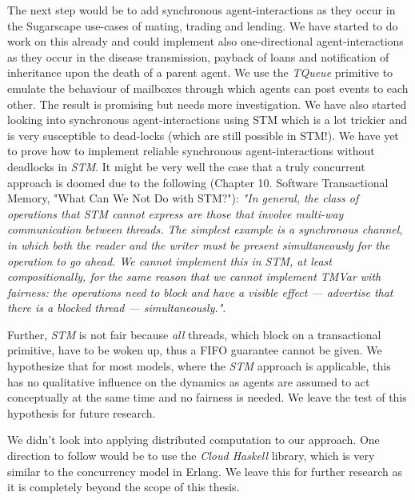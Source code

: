 The next step would be to add synchronous agent-interactions as they occur in the Sugarscape use-cases of mating, trading and lending. We have started to do work on this already and could implement also one-directional agent-interactions as they occur in the disease transmission, payback of loans and notification of inheritance upon the death of a parent agent. We use the \textit{TQueue} primitive to emulate the behaviour of mailboxes through which agents can post events to each other. The result is promising but needs more investigation. We have also started looking into synchronous agent-interactions using STM which is a lot trickier and is very susceptible to dead-locks (which are still possible in STM!). We have yet to prove how to implement reliable synchronous agent-interactions without deadlocks in \textit{STM}. It might be very well the case that a truly concurrent approach is doomed due to the following \cite{marlow_parallel_2013} (Chapter 10. Software Transactional Memory, "What Can We Not Do with STM?"): \textit{"In general, the class of operations that STM cannot express are those that involve multi-way communication between threads. The simplest example is a synchronous channel, in which both the reader and the writer must be present simultaneously for the operation to go ahead. We cannot implement this in STM, at least compositionally, for the same reason that we cannot implement TMVar with fairness: the operations need to block and have a visible effect — advertise that there is a blocked thread — simultaneously."}. 

Further, \textit{STM} is not fair because \textit{all} threads, which block on a transactional primitive, have to be woken up, thus a FIFO guarantee cannot be given. We hypothesize that for most models, where the \textit{STM} approach is applicable, this has no qualitative influence on the dynamics as agents are assumed to act conceptually at the same time and no fairness is needed. We leave the test of this hypothesis for future research.

We didn't look into applying distributed computation to our approach. One direction to follow would be to use the \textit{Cloud Haskell} library, which is very similar to the concurrency model in Erlang. We leave this for further research as it is completely beyond the scope of this thesis.

